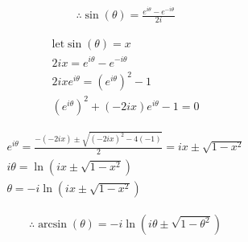 \documentclass{../../style}
\begin{document}
\eulerformula

\begin{gather*}
	\therefore \sin(\theta) = \frac{e^{i\theta} - e^{-i\theta}}{2i}
\end{gather*}

\begin{gather*}
	\text{let} \sin(\theta) = x \\
	2ix = e^{i\theta} - e^{-i\theta} \\
	2ixe^{i\theta} = (e^{i\theta})^2 - 1 \\ 
	(e^{i\theta})^2 + (-2ix)e^{i\theta} - 1 = 0
\end{gather*}

\begin{gather*}
	e^{i\theta} = \frac{-(-2ix) \pm \sqrt{(-2ix)^2 - 4(-1)}}{2} = ix \pm \sqrt{1 - x^2} \\
	i\theta = \ln(ix \pm \sqrt{1 - x^2}) \\
	\theta = -i\ln(ix \pm \sqrt{1 - x^2})
\end{gather*}

\begin{gather*}
	\therefore \arcsin(\theta) = -i\ln(i\theta \pm \sqrt{1 -\theta^2})
\end{gather*}
\end{document}
